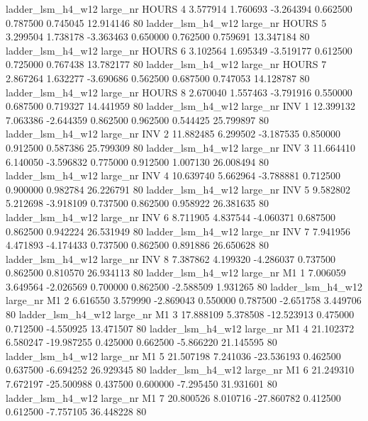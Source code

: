   ladder_lsm_h4_w12   large_nr    HOURS                 4  3.577914  1.760693  -3.264394 0.662500 0.787500  0.745045   12.914146 80
  ladder_lsm_h4_w12   large_nr    HOURS                 5  3.299504  1.738178  -3.363463 0.650000 0.762500  0.759691   13.347184 80
  ladder_lsm_h4_w12   large_nr    HOURS                 6  3.102564  1.695349  -3.519177 0.612500 0.725000  0.767438   13.782177 80
  ladder_lsm_h4_w12   large_nr    HOURS                 7  2.867264  1.632277  -3.690686 0.562500 0.687500  0.747053   14.128787 80
  ladder_lsm_h4_w12   large_nr    HOURS                 8  2.670040  1.557463  -3.791916 0.550000 0.687500  0.719327   14.441959 80
  ladder_lsm_h4_w12   large_nr      INV                 1 12.399132  7.063386  -2.644359 0.862500 0.962500  0.544425   25.799897 80
  ladder_lsm_h4_w12   large_nr      INV                 2 11.882485  6.299502  -3.187535 0.850000 0.912500  0.587386   25.799309 80
  ladder_lsm_h4_w12   large_nr      INV                 3 11.664410  6.140050  -3.596832 0.775000 0.912500  1.007130   26.008494 80
  ladder_lsm_h4_w12   large_nr      INV                 4 10.639740  5.662964  -3.788881 0.712500 0.900000  0.982784   26.226791 80
  ladder_lsm_h4_w12   large_nr      INV                 5  9.582802  5.212698  -3.918109 0.737500 0.862500  0.958922   26.381635 80
  ladder_lsm_h4_w12   large_nr      INV                 6  8.711905  4.837544  -4.060371 0.687500 0.862500  0.942224   26.531949 80
  ladder_lsm_h4_w12   large_nr      INV                 7  7.941956  4.471893  -4.174433 0.737500 0.862500  0.891886   26.650628 80
  ladder_lsm_h4_w12   large_nr      INV                 8  7.387862  4.199320  -4.286037 0.737500 0.862500  0.810570   26.934113 80
  ladder_lsm_h4_w12   large_nr       M1                 1  7.006059  3.649564  -2.026569 0.700000 0.862500 -2.588509    1.931265 80
  ladder_lsm_h4_w12   large_nr       M1                 2  6.616550  3.579990  -2.869043 0.550000 0.787500 -2.651758    3.449706 80
  ladder_lsm_h4_w12   large_nr       M1                 3 17.888109  5.378508 -12.523913 0.475000 0.712500 -4.550925   13.471507 80
  ladder_lsm_h4_w12   large_nr       M1                 4 21.102372  6.580247 -19.987255 0.425000 0.662500 -5.866220   21.145595 80
  ladder_lsm_h4_w12   large_nr       M1                 5 21.507198  7.241036 -23.536193 0.462500 0.637500 -6.694252   26.929345 80
  ladder_lsm_h4_w12   large_nr       M1                 6 21.249310  7.672197 -25.500988 0.437500 0.600000 -7.295450   31.931601 80
  ladder_lsm_h4_w12   large_nr       M1                 7 20.800526  8.010716 -27.860782 0.412500 0.612500 -7.757105   36.448228 80
